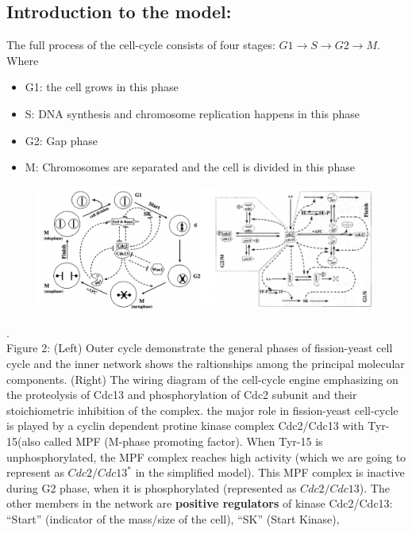 \documentclass{article}
\begin{document}
\subsection*{Introduction to the model:}
The full process of the cell-cycle consists of four stages: $G1 \rightarrow 
S \rightarrow G2 \rightarrow M$. Where 
\begin{itemize}
  \item G1: the cell grows in this phase 
  \item S: DNA synthesis and chromosome replication happens in this phase
  \item G2: Gap phase 
  \item M: Chromosomes are separated and the cell is divided in this phase
\end{itemize}
\begin{figure}[H]
  \centering
  \includegraphics[width=\linewidth, scale=0.5]{cell_cycle_complicated.png}
\end{figure}
. \\
Figure 2: (Left) Outer cycle demonstrate the general phases of 
fission-yeast cell cycle and the inner network shows the raltionships among the 
principal molecular components. (Right) The wiring diagram of the cell-cycle 
engine emphasizing on the proteolysis of Cdc13 and phosphorylation of Cdc2 
subunit and their stoichiometric inhibition of the complex. \cite{math_model}
\newline \newline
the major role in fission-yeast cell-cycle is played by a cyclin dependent 
protine kinase complex Cdc2/Cdc13 with Tyr-15(also called MPF (M-phase promoting factor).
When Tyr-15 is unphosphorylated, the MPF complex reaches high activity (which we 
are going to represent as $Cdc2/Cdc13^*$ in the simplified model). This MPF complex
is inactive during G2 phase, when it is phosphorylated (represented as $Cdc2/Cdc13$).
The other members in the network are \textbf{positive regulators} of kinase Cdc2/Cdc13:
``Start'' (indicator of the mass/size of the cell), ``SK'' (Start Kinase), 
\end{document}
